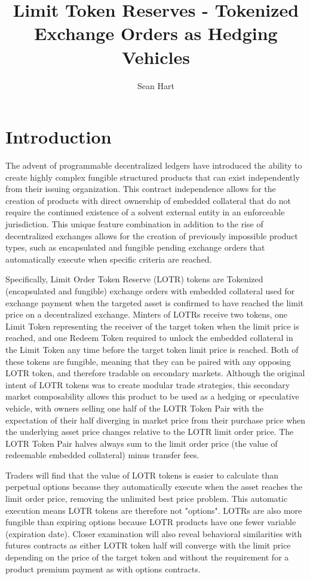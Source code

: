 \documentclass[12pt]{article}
\title{Limit Token Reserves - Tokenized Exchange Orders as Hedging Vehicles}
\author{Sean Hart}
\begin{document}
   \maketitle

   \begin{abstract}

   \end{abstract}

   \section*{Introduction}
   The advent of programmable decentralized ledgers have introduced the ability to create highly complex fungible structured products that can exist independently from their issuing organization. This contract independence allows for the creation of products with direct ownership of embedded collateral that do not require the continued existence of a solvent external entity in an enforceable jurisdiction. This unique feature combination in addition to the rise of decentralized exchanges allows for the creation of previously impossible product types, such as encapsulated and fungible pending exchange orders that automatically execute when specific criteria are reached.

   Specifically, Limit Order Token Reserve (LOTR) tokens are Tokenized (encapsulated and fungible) exchange orders with embedded collateral used for exchange payment when the targeted asset is confirmed to have reached the limit price on a decentralized exchange. Minters of LOTRs receive two tokens, one Limit Token representing the receiver of the target token when the limit price is reached, and one Redeem Token required to unlock the embedded collateral in the Limit Token any time before the target token limit price is reached. Both of these tokens are fungible, meaning that they can be paired with any opposing LOTR token, and therefore tradable on secondary markets. Although the original intent of LOTR tokens was to create modular trade strategies, this secondary market composability allows this product to be used as a hedging or speculative vehicle, with owners selling one half of the LOTR Token Pair with the expectation of their half diverging in market price from their purchase price when the underlying asset price changes relative to the LOTR limit order price. The LOTR Token Pair halves always sum to the limit order price (the value of redeemable embedded collateral) minus transfer fees.

   Traders will find that the value of LOTR tokens is easier to calculate than perpetual options because they automatically execute when the asset reaches the limit order price, removing the unlimited best price problem. This automatic execution means LOTR tokens are therefore not "options". LOTRs are also more fungible than expiring options because LOTR products have one fewer variable (expiration date). Closer examination will also reveal behavioral similarities with futures contracts as either LOTR token half will converge with the limit price depending on the price of the target token and without the requirement for a product premium payment as with options contracts.
\end{document}

